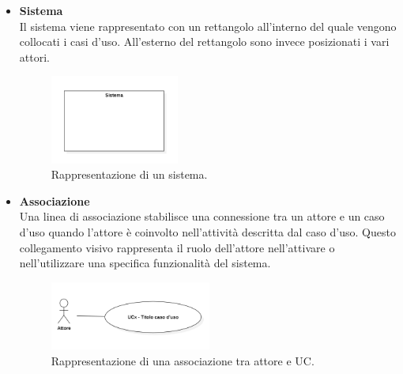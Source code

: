 \documentclass[10pt]{article}
\begin{document}
\begin{justify}
\begin{itemize}
            \item \textbf{Sistema}\\
            Il sistema viene rappresentato con un rettangolo all'interno del quale vengono collocati i casi d'uso. All'esterno del rettangolo sono invece posizionati i vari attori.
            \begin{figure}[H]
            \centering
            \includegraphics[width=0.4\textwidth]{Sistema.PNG}
            \caption{Rappresentazione di un sistema.}
            \end{figure}

            \item \textbf{Associazione}\\
            Una linea di associazione stabilisce una connessione tra un attore e un caso d'uso quando l'attore è coinvolto nell'attività descritta dal caso d'uso. Questo collegamento visivo rappresenta il ruolo dell'attore nell'attivare o nell'utilizzare una specifica funzionalità del sistema.
            \begin{figure}[H]
            \centering
            \includegraphics[width=0.5\textwidth]{AssociazioneAttore.PNG}
            \caption{Rappresentazione di una associazione tra attore e UC.}
            \end{figure}


\end{itemize}
\end{justify}
\end{document}

